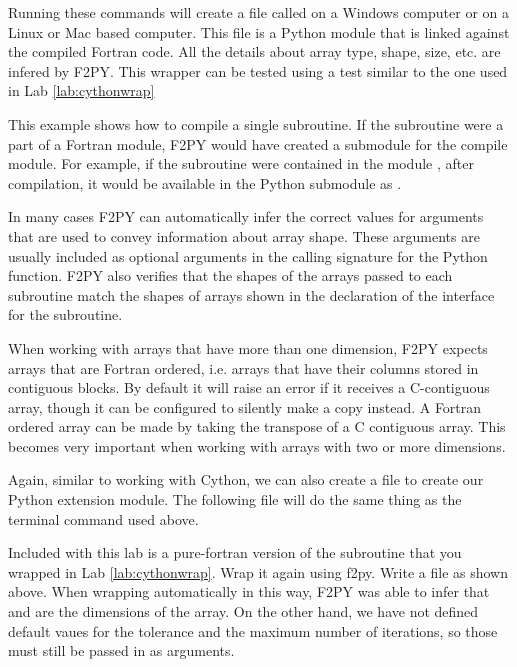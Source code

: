 Running these commands will create a file called  on a Windows computer or  on a Linux or Mac based computer.
This file is a Python module that is linked against the compiled Fortran code.
All the details about array type, shape, size, etc. are infered by F2PY.
This wrapper can be tested using a test similar to the one used in Lab \ref{lab:cythonwrap}

\begin{info}
This example shows how to compile a single subroutine.
If the subroutine were a part of a Fortran module, F2PY would have created a submodule for the compile module.
For example, if the subroutine were contained in the module , after compilation, it would be available in the Python submodule  as .
\end{info}

\begin{info}
In many cases F2PY can automatically infer the correct values for arguments that are used to convey information about array shape.
These arguments are usually included as optional arguments in the calling signature for the Python function.
F2PY also verifies that the shapes of the arrays passed to each subroutine match the shapes of arrays shown in the declaration of the interface for the subroutine.
\end{info}

\begin{warn}
When working with arrays that have more than one dimension, F2PY expects arrays that are Fortran ordered, i.e. arrays that have their columns stored in contiguous blocks.
By default it will raise an error if it receives a C-contiguous array, though it can be configured to silently make a copy instead.
A Fortran ordered array can be made by taking the transpose of a C contiguous array.
This becomes very important when working with arrays with two or more dimensions.
\end{warn}

Again, similar to working with Cython, we can also create a  file to create our Python extension module.
The following  file will do the same thing as the terminal command used above.


\begin{problem}
Included with this lab is a pure-fortran version of the  subroutine that you wrapped in Lab \ref{lab:cythonwrap}.
Wrap it again using f2py.
Write a  file as shown above.
When wrapping automatically in this way, F2PY was able to infer that  and  are the dimensions of the array.
On the other hand, we have not defined default vaues for the tolerance and the maximum number of iterations, so those must still be passed in as arguments.
\end{problem}

